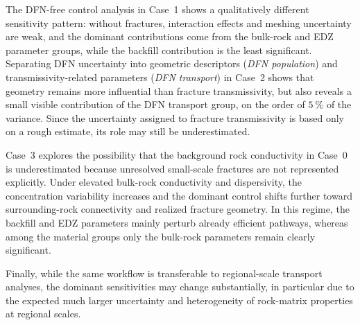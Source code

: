The DFN-free control analysis in Case~1 shows a qualitatively different sensitivity pattern: without fractures, interaction effects and meshing uncertainty are weak, and the dominant contributions come from the bulk-rock and EDZ parameter groups, while the backfill contribution is the least significant. Separating DFN uncertainty into geometric descriptors (\emph{DFN population}) and transmissivity-related parameters (\emph{DFN transport}) in Case~2 shows that geometry remains more influential than fracture transmissivity, but also reveals a small visible contribution of the DFN transport group, on the order of $5~\%$ of the variance. Since the uncertainty assigned to fracture transmissivity is based only on a rough estimate, its role may still be underestimated.

Case~3 explores the possibility that the background rock conductivity in Case~0 is underestimated because unresolved small-scale fractures are not represented explicitly. Under elevated bulk-rock conductivity and dispersivity, the concentration variability increases and the dominant control shifts further toward surrounding-rock connectivity and realized fracture geometry. In this regime, the backfill and EDZ parameters mainly perturb already efficient pathways, whereas among the material groups only the bulk-rock parameters remain clearly significant.

Finally, while the same workflow is transferable to regional-scale transport analyses, the dominant sensitivities may change substantially, in particular due to the expected much larger uncertainty and heterogeneity of rock-matrix properties at regional scales.
